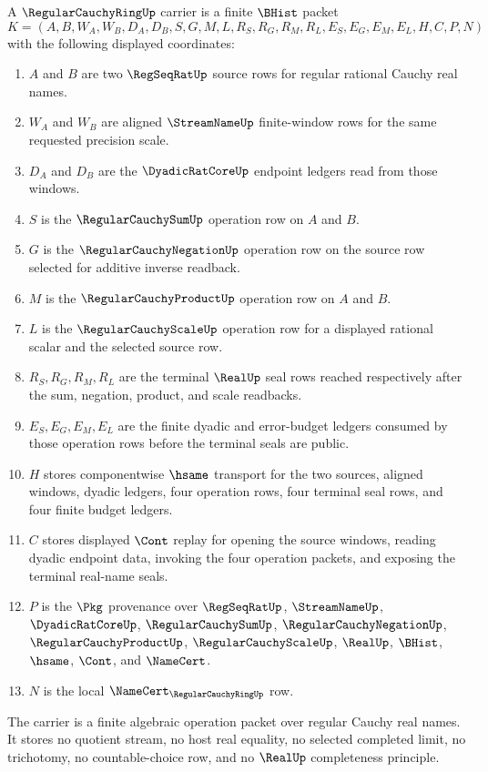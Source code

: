 \begin{definition}
\label{def:regular-cauchy-ring-carrier}
A $\RegularCauchyRingUp$ carrier is a finite $\BHist$ packet
$$
K=(A,B,W_A,W_B,D_A,D_B,S,G,M,L,R_S,R_G,R_M,R_L,E_S,E_G,E_M,E_L,H,C,P,N)
$$
with the following displayed coordinates:
\begin{enumerate}
\item $A$ and $B$ are two $\RegSeqRatUp$ source rows for regular rational Cauchy real names.
\item $W_A$ and $W_B$ are aligned $\StreamNameUp$ finite-window rows for the same requested precision scale.
\item $D_A$ and $D_B$ are the $\DyadicRatCoreUp$ endpoint ledgers read from those windows.
\item $S$ is the $\RegularCauchySumUp$ operation row on $A$ and $B$.
\item $G$ is the $\RegularCauchyNegationUp$ operation row on the source row selected for additive inverse readback.
\item $M$ is the $\RegularCauchyProductUp$ operation row on $A$ and $B$.
\item $L$ is the $\RegularCauchyScaleUp$ operation row for a displayed rational scalar and the selected source row.
\item $R_S,R_G,R_M,R_L$ are the terminal $\RealUp$ seal rows reached respectively after the sum, negation, product, and scale readbacks.
\item $E_S,E_G,E_M,E_L$ are the finite dyadic and error-budget ledgers consumed by those operation rows before the terminal seals are public.
\item $H$ stores componentwise $\hsame$ transport for the two sources, aligned windows, dyadic ledgers, four operation rows, four terminal seal rows, and four finite budget ledgers.
\item $C$ stores displayed $\Cont$ replay for opening the source windows, reading dyadic endpoint data, invoking the four operation packets, and exposing the terminal real-name seals.
\item $P$ is the $\Pkg$ provenance over $\RegSeqRatUp$, $\StreamNameUp$, $\DyadicRatCoreUp$, $\RegularCauchySumUp$, $\RegularCauchyNegationUp$, $\RegularCauchyProductUp$, $\RegularCauchyScaleUp$, $\RealUp$, $\BHist$, $\hsame$, $\Cont$, and $\NameCert$.
\item $N$ is the local $\NameCert_{\RegularCauchyRingUp}$ row.
\end{enumerate}
The carrier is a finite algebraic operation packet over regular Cauchy real names. It stores no quotient stream, no host real equality, no selected completed limit, no trichotomy, no countable-choice row, and no $\RealUp$ completeness principle.
\end{definition}

